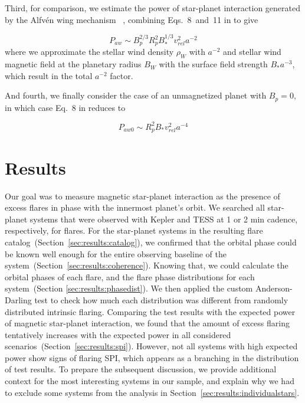\documentclass[twocolumn]{aastex631}
\begin{document}
Third, for comparison, we estimate the power of star-planet interaction generated by the Alfv\'en wing mechanism ~\citep{saur2013magnetic,kavanagh2022radio}, combining Eqs.~8~and~11 in \citet{kavanagh2022radio} to give

\begin{equation}
    P_{aw} \sim B_p^{2/3} R_{p}^2    B_*^{1/3}  v_{rel}^2 a^{-2}  
\end{equation}
where we approximate the stellar wind density $\rho_W$ with $a^{-2}$ and stellar wind magnetic field at the planetary radius $B_W$ with the surface field strength $B_* a^{-3}$, which result in the total $a^{-2}$ factor.

And fourth, we finally consider the case of an unmagnetized planet with $B_p=0$, in which case Eq.~8 in \cite{kavanagh2022radio} reduces to

\begin{equation}
    P_{aw0} \sim R_p^2  B_*  v_{rel}^2  a^{-4}
\end{equation}


\section{Results}
\label{sec:results}

Our goal was to measure magnetic star-planet interaction as the presence of excess flares in phase with the innermost planet's orbit. We searched all star-planet systems that were observed with Kepler and TESS at 1 or 2 min cadence, respectively, for flares. For the star-planet systems in the resulting flare catalog~(Section~\ref{sec:results:catalog}), we confirmed that the orbital phase could be known well enough for the entire observing baseline of the system~(Section~\ref{sec:results:coherence}). Knowing that, we could calculate the orbital phases of each flare, and the flare phase distributions for each system~(Section \ref{sec:results:phasedist}). We then applied the custom Anderson-Darling test to check how much each distribution was different from randomly distributed intrinsic flaring. Comparing the test results with the expected power of magnetic star-planet interaction, we found that the amount of excess flaring tentatively increases with the expected power in all considered scenarios~(Section~\ref{sec:results:spi}). However, not all systems with high expected power show signs of flaring SPI, which appears as a branching in the distribution of test results. To prepare the subsequent discussion, we provide additional context for the most interesting systems in our sample, and explain why we had to exclude some systems from the analysis in Section~\ref{sec:results:individualstars}.
\end{document}
